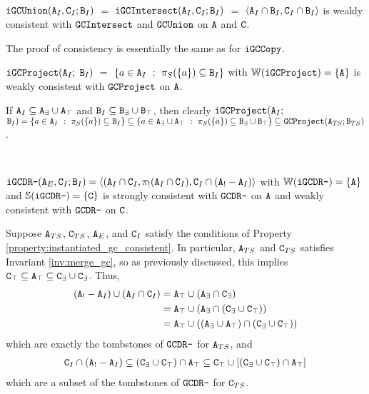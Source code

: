 \begin{example}
~

$\tt{iGCUnion}(\tt{A}_I, \tt{C}_I; \tt{B}_I)$ $=$ $\tt{iGCIntersect}(\tt{A}_I, \tt{C}_I; \tt{B}_I)$ $=$ $\langle \tt{A}_I \cap \tt{B}_I, \tt{C}_I \cap \tt{B}_I \rangle$ is weakly consistent with $\tt{GCIntersect}$ and $\tt{GCUnion}$ on $\tt{A}$ and $\tt{C}$.
\end{example}
The proof of consistency is essentially the same as for $\tt{iGCCopy}$.

\begin{example}[Project GC]
$\tt{iGCProject}(\tt{A}_I;$ $\tt{B}_I)$ $=$ $\{a \in \tt{A}_I ~:~ \pi_S(\{a\}) \subseteq \tt{B}_I\}$ with $\mathbb{W}(\tt{iGCProject}) = \{\tt{A}\}$ is weakly consistent with $\tt{GCProject}$ on $\tt{A}$.
\end{example}

If $\tt{A}_I \subseteq \tt{A}_\exists \cup \tt{A}_\top$ and $\tt{B}_I \subseteq \tt{B}_\exists \cup \tt{B}_\top$, then
clearly $\tt{iGCProject}(\tt{A}_I;$ $\tt{B}_I) = \{a \in \tt{A}_I ~:~ \pi_S(\{a\}) \subseteq \tt{B}_I\} \subseteq \{a \in \tt{A}_\exists \cup \tt{A}_\top ~:~ \pi_S(\{a\}) \subseteq \tt{B}_\exists \cup \tt{B}_\top\} \subseteq \tt{GCProject}(\tt{A}_{TS}; \tt{B}_{TS})$.

\begin{example}
\label{ex:instantiated:dr-}
~

$\tt{iGCDR-}(\tt{A}_E, \tt{C}_I; \tt{B}_I) = \langle (\tt{A}_I \cap \tt{C}_I, \pi_!(\tt{A}_I \cap \tt{C}_I), \tt{C}_I \cap (\tt{A}_! - \tt{A}_I)\rangle$ with $\mathbb{W}(\tt{iGCDR-}) = \{\tt{A}\}$ and $\mathbb{S}(\tt{iGCDR-}) = \{\tt{C}\}$ is strongly consistent with $\tt{GCDR-}$ on $\tt{A}$ and weakly consistent with $\tt{GCDR-}$ on $\tt{C}$.
\end{example}
Suppose $\tt{A}_{TS}$, $\tt{C}_{TS}$, $\tt{A}_E$, and $\tt{C}_I$ satisfy the conditions of Property \ref{property:instantiated_gc_consistent}.
In particular, $\tt{A}_{TS}$ and $\tt{C}_{TS}$ satisfies Invariant \ref{inv:merge_gc}, so as previously discussed, this implies $\tt{C}_\top \subseteq \tt{A}_\top \subseteq \tt{C}_\exists \cup \tt{C}_\exists$.
Thus,
\begin{align*}
(\tt{A}_! - \tt{A}_I) \cup (\tt{A}_I \cap \tt{C}_I)
&= \tt{A}_\top \cup (\tt{A}_\exists \cap \tt{C}_\exists)\\
&= \tt{A}_\top \cup (\tt{A}_\exists \cap (\tt{C}_\exists \cup \tt{C}_\top))\\
&= \tt{A}_\top \cup ((\tt{A}_\exists \cup \tt{A}_\top) \cap (\tt{C}_\exists \cup \tt{C}_\top))
\end{align*}
which are exactly the tombstones of $\tt{GCDR-}$ for $\tt{A}_{TS}$, and
\begin{align*}
\tt{C}_I \cap (\tt{A}_! - \tt{A}_I) \subseteq (\tt{C}_\exists \cup \tt{C}_\top) \cap \tt{A}_\top \subseteq \tt{C}_\top \cup [(\tt{C}_\exists \cup \tt{C}_\top) \cap \tt{A}_\top]
\end{align*}
which are a subset of the tombstones of $\tt{GCDR-}$ for $\tt{C}_{TS}$.



